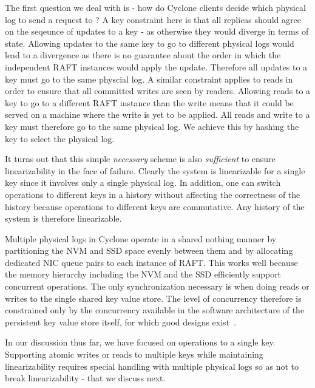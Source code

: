 \documentclass[pageno]{jpaper}
\begin{document}
The first question we deal with is - how do Cyclone clients decide which
physical log to send a request to ? A key constraint here is that all replicas
should agree on the seqeunce of updates to a key - as otherwise they would
diverge in terms of state. Allowing updates to the same key to go to different
physical logs would lead to a divergence as there is no guarantee about the
order in which the independent RAFT instances would apply the update. Therefore
all updates to a key must go to the same physcial log. A similar constraint
applies to reads in order to ensure that all committed writes are seen by
readers. Allowing reads to a key to go to a different RAFT instance than the
write means that it could be served on a machine where the write is yet to be
applied. All reads and write to a key must therefore go to the same physical
log. We achieve this by hashing the key to select the physical log.

It turns out that this simple \emph{necessary} scheme is also \emph{sufficient}
to ensure linearizability in the face of failure. Clearly the system is
linearizable for a single key since it involves only a single physical log. In
addition, one can switch operations to different keys in a history without
affecting the correctness of the history because operations to different keys
are commutative. Any history of the system is therefore linearizable.

Multiple physical logs in Cyclone operate in a shared nothing manner by
partitioning the NVM and SSD space evenly between them and by allocating
dedicated NIC queue pairs to each instance of RAFT. This works well because the
memory hierarchy including the NVM and the SSD efficiently support concurrent
operations. The only synchronization necessary is when doing reads or writes to
the single shared key value store.  The level of concurrency therefore is
constrained only by the concurrency available in the software architecture of
the persistent key value store itself, for which good designs
exist~\cite{flodb}.

In our discussion thus far, we have focused on operations to a single
key. Supporting atomic writes or reads to multiple keys while maintaining
linearizability requires special handling with multiple physical logs so as not
to break linearizability - that we discuss next.
\end{document}

